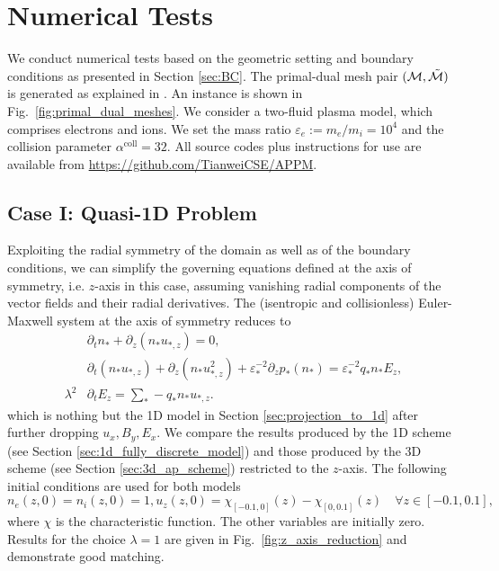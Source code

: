 \documentclass{article}
\begin{document}
\section{Numerical Tests} \label{sec:numerical_experiment}

We conduct numerical tests based on the geometric setting and boundary conditions as
presented in Section \ref{sec:BC}. The primal-dual mesh pair
$(\mathcal{M}, \Tilde{\mathcal{M}})$ is generated as explained in
\cite[][Ch. 1]{fuchs_2021}. An instance is shown in Fig.~\ref{fig:primal_dual_meshes}. We
consider a two-fluid plasma model, which comprises electrons and ions. We set the mass
ratio $\varepsilon_e := m_e / m_i = 10^4$ and the collision parameter
$\alpha^\text{coll} = 32$. All source codes plus instructions for use are available from
\url{https://github.com/TianweiCSE/APPM}.

\subsection{Case I: Quasi-1D Problem}

Exploiting the radial symmetry of the domain as well as of the boundary conditions, we can
simplify the governing equations defined at the axis of symmetry, i.e. $z$-axis in this
case, assuming vanishing radial components of the vector fields and their radial
derivatives. The (isentropic and collisionless) Euler-Maxwell system at the axis of
symmetry reduces to
\begin{align*}
    &\partial_t n_* + \partial_z(n_*u_{*,z}) = 0, \\
    &\partial_t (n_* u_{*,z}) + \partial_z(n_*u_{*,z}^2) + \varepsilon_*^{-2} \partial_z p_*(n_*) = \varepsilon_*^{-2}q_*n_*E_z, \\
    \lambda^2 &\partial_t E_z = \sum_* - q_* n_* u_{*,z}.
\end{align*}
which is nothing but the 1D model in Section \ref{sec:projection_to_1d} after further
dropping $u_x, B_y, E_x$. We compare the results produced by the 1D scheme (see Section
\ref{sec:1d_fully_discrete_model}) and those produced by the 3D scheme (see Section
\ref{sec:3d_ap_scheme}) restricted to the $z$-axis. The following initial conditions are
used for both models
\begin{equation*}
    n_e(z,0) = n_i(z,0) = 1, u_z(z,0) = \chi_{[-0.1,0]}(z) - \chi_{[0,0.1]}(z)\quad \forall z \in [-0.1,0.1],
\end{equation*}
where $\chi$ is the characteristic function. The other variables are initially
zero. Results for the choice $\lambda = 1$ are given in Fig.~\ref{fig:z_axis_reduction}
and demonstrate good matching.
\end{document}
